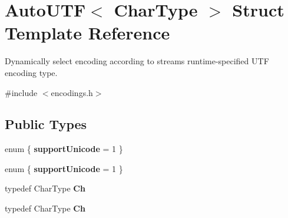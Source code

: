 \hypertarget{structAutoUTF}{}\section{Auto\+U\+TF$<$ Char\+Type $>$ Struct Template Reference}
\label{structAutoUTF}


Dynamically select encoding according to stream\textquotesingle{}s runtime-\/specified U\+TF encoding type.  




{\ttfamily \#include $<$encodings.\+h$>$}

\subsection*{Public Types}
\begin{DoxyCompactItemize}
\item 
\mbox{\label{structAutoUTF_a8a395ec3c5c17e0b33280a52cc07b5e2}} 
enum \{ {\bfseries support\+Unicode} = 1
 \}
\item 
\mbox{\label{structAutoUTF_a586a04a46be0cbafb1212903b0804464}} 
enum \{ {\bfseries support\+Unicode} = 1
 \}
\item 
\mbox{\label{structAutoUTF_a0609343de776df3bc31b4c980eb3cf1c}} 
typedef Char\+Type {\bfseries Ch}
\item 
\mbox{\label{structAutoUTF_a0609343de776df3bc31b4c980eb3cf1c}} 
typedef Char\+Type {\bfseries Ch}
\end{DoxyCompactItemize}
